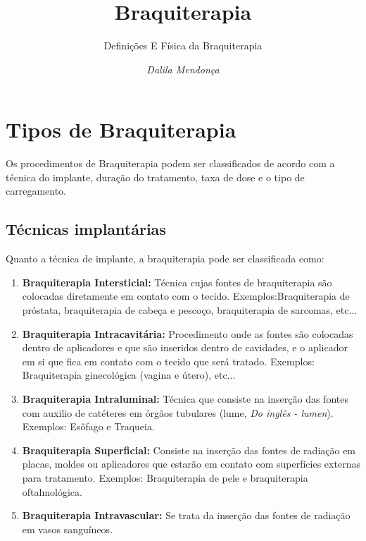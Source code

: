 \documentclass[11pt,a4paper]{article}
\title{Braquiterapia}
\author{Definições E Física da Braquiterapia\nocite{*}}
\date{\textit{Dalila Mendonça}}
\begin{document}
	\maketitle



	\section{Tipos de Braquiterapia}

	Os procedimentos de Braquiterapia podem ser classificados de acordo com a técnica do implante, duração do tratamento, taxa de dose e o tipo de carregamento.

		\subsection{Técnicas implantárias}

			Quanto a técnica de implante, a braquiterapia pode ser classificada como:

		\begin{enumerate}
			\item \textbf{Braquiterapia Intersticial:} Técnica cujas fontes de braquiterapia são colocadas diretamente em contato com o tecido. Exemplos:Braquiterapia de próstata, braquiterapia de cabeça e pescoço, braquiterapia de sarcomas, etc...
			
			\item \textbf{Braquiterapia Intracavitária:}  Procedimento onde as fontes são colocadas dentro de aplicadores e que são inseridos dentro de cavidades, e o aplicador em si que fica em contato com o tecido que será tratado. Exemplos: Braquiterapia ginecológica (vagina e útero), etc...
			
			
			\item \textbf{Braquiterapia Intraluminal:} Técnica que consiste na inserção das fontes com auxilio de catéteres em órgãos tubulares (lume, \textit{Do inglês - lumen}). Exemplos: Esôfago e Traqueia.
			
			\item \textbf{Braquiterapia Superficial:} Consiste na inserção das fontes de radiação em placas, moldes ou aplicadores que estarão em contato com superfícies externas para tratamento. Exemplos: Braquiterapia de pele e braquiterapia oftalmológica.
			
			\item \textbf{Braquiterapia Intravascular:} Se trata da inserção das fontes de radiação em vasos sanguíneos.

		\end{enumerate}
\end{document}
